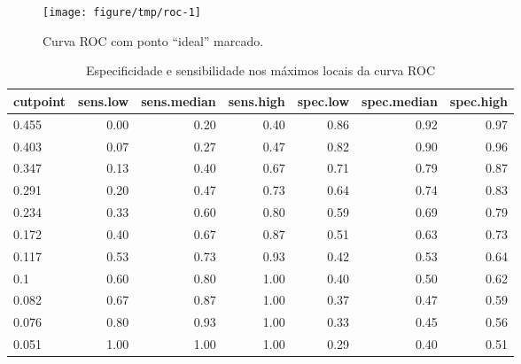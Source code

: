 \documentclass[a4paper,titlepage]{ppgi}\usepackage[]{graphicx}\usepackage[]{color}
\newenvironment{knitrout}{}{} %
\begin{document}
{\begin{knitrout}
\color{fgcolor}\begin{figure}
\texttt{[image: figure/tmp/roc-1]} \caption[Curva ROC com ponto ``ideal'' marcado]{Curva ROC com ponto ``ideal'' marcado.}\label{fig:roc}
\end{figure}


\end{knitrout}

\begin{table}
\centering
\begin{knitrout}
\color{fgcolor}
\begin{tabular}{l|r|r|r|r|r|r}
\hline
cutpoint & sens.low & sens.median & sens.high & spec.low & spec.median & spec.high\\
\hline
0.455 & 0.00 & 0.20 & 0.40 & 0.86 & 0.92 & 0.97\\
\hline
0.403 & 0.07 & 0.27 & 0.47 & 0.82 & 0.90 & 0.96\\
\hline
0.347 & 0.13 & 0.40 & 0.67 & 0.71 & 0.79 & 0.87\\
\hline
0.291 & 0.20 & 0.47 & 0.73 & 0.64 & 0.74 & 0.83\\
\hline
0.234 & 0.33 & 0.60 & 0.80 & 0.59 & 0.69 & 0.79\\
\hline
0.172 & 0.40 & 0.67 & 0.87 & 0.51 & 0.63 & 0.73\\
\hline
0.117 & 0.53 & 0.73 & 0.93 & 0.42 & 0.53 & 0.64\\
\hline
0.1 & 0.60 & 0.80 & 1.00 & 0.40 & 0.50 & 0.62\\
\hline
0.082 & 0.67 & 0.87 & 1.00 & 0.37 & 0.47 & 0.59\\
\hline
0.076 & 0.80 & 0.93 & 1.00 & 0.33 & 0.45 & 0.56\\
\hline
0.051 & 1.00 & 1.00 & 1.00 & 0.29 & 0.40 & 0.51\\
\hline
\end{tabular}


\end{knitrout}
\caption{Especificidade e sensibilidade nos máximos locais da curva ROC}
\label{table:roc}
\end{table}

%
%
%
\end{document}
